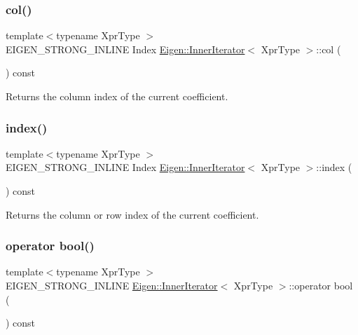 \subsubsection{\texorpdfstring{col()}{col()}}
{\footnotesize\ttfamily template$<$typename Xpr\+Type $>$ \\
E\+I\+G\+E\+N\+\_\+\+S\+T\+R\+O\+N\+G\+\_\+\+I\+N\+L\+I\+NE Index \mbox{\hyperlink{class_eigen_1_1_inner_iterator}{Eigen\+::\+Inner\+Iterator}}$<$ Xpr\+Type $>$\+::col (\begin{DoxyParamCaption}{ }\end{DoxyParamCaption}) const\hspace{0.3cm}{\ttfamily [inline]}}

\begin{DoxyReturn}{Returns}
the column index of the current coefficient. 
\end{DoxyReturn}
\mbox{\label{class_eigen_1_1_inner_iterator_ac9e0e40b8aceb192a0e1c7d656148760}} 
\subsubsection{\texorpdfstring{index()}{index()}}
{\footnotesize\ttfamily template$<$typename Xpr\+Type $>$ \\
E\+I\+G\+E\+N\+\_\+\+S\+T\+R\+O\+N\+G\+\_\+\+I\+N\+L\+I\+NE Index \mbox{\hyperlink{class_eigen_1_1_inner_iterator}{Eigen\+::\+Inner\+Iterator}}$<$ Xpr\+Type $>$\+::index (\begin{DoxyParamCaption}{ }\end{DoxyParamCaption}) const\hspace{0.3cm}{\ttfamily [inline]}}

\begin{DoxyReturn}{Returns}
the column or row index of the current coefficient. 
\end{DoxyReturn}
\mbox{\label{class_eigen_1_1_inner_iterator_a0f11df2dfcd1c48c54aa29e605c09310}} 
\subsubsection{\texorpdfstring{operator bool()}{operator bool()}}
{\footnotesize\ttfamily template$<$typename Xpr\+Type $>$ \\
E\+I\+G\+E\+N\+\_\+\+S\+T\+R\+O\+N\+G\+\_\+\+I\+N\+L\+I\+NE \mbox{\hyperlink{class_eigen_1_1_inner_iterator}{Eigen\+::\+Inner\+Iterator}}$<$ Xpr\+Type $>$\+::operator bool (\begin{DoxyParamCaption}{ }\end{DoxyParamCaption}) const\hspace{0.3cm}{\ttfamily [inline]}}

